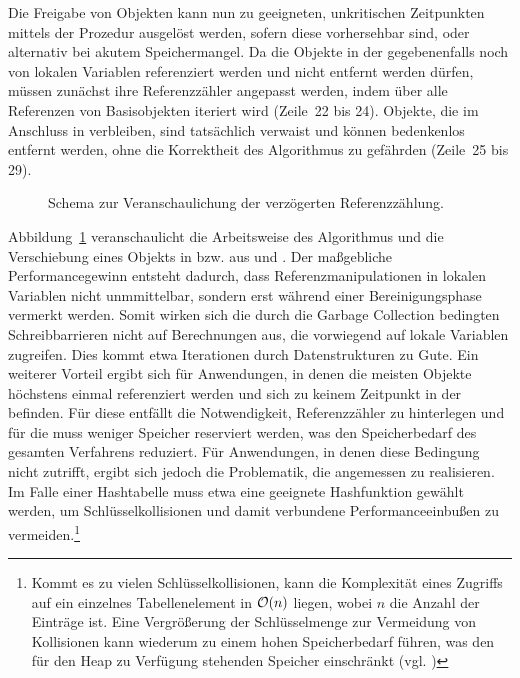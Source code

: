 Die Freigabe von Objekten kann nun zu geeigneten, unkritischen Zeitpunkten mittels der Prozedur  ausgelöst werden, sofern diese vorhersehbar sind, oder alternativ bei akutem Speichermangel.
Da die Objekte in der  gegebenenfalls noch von lokalen Variablen referenziert werden und nicht entfernt werden dürfen, müssen zunächst ihre Referenzzähler angepasst werden, indem über alle Referenzen von Basisobjekten iteriert wird (Zeile~22 bis 24).
Objekte, die im Anschluss in  verbleiben, sind tatsächlich verwaist und können bedenkenlos entfernt werden, ohne die Korrektheit des Algorithmus zu gefährden (Zeile~25 bis 29).

\begin{figure}[h]
	\centering
	
	\caption[Veranschaulichung der verzögerten Referenzzählung]{Schema zur Veranschaulichung der verzögerten Referenzzählung.}
	\label{fig:rc-deferred}
\end{figure}

Abbildung~\ref{fig:rc-deferred} veranschaulicht die Arbeitsweise des Algorithmus und die Verschiebung eines Objekts  in bzw. aus  und .
Der maßgebliche Performancegewinn entsteht dadurch, dass Referenzmanipulationen in lokalen Variablen nicht unmmittelbar, sondern erst während einer Bereinigungsphase vermerkt werden.
Somit wirken sich die durch die Garbage Collection bedingten Schreibbarrieren nicht auf Berechnungen aus, die vorwiegend auf lokale Variablen zugreifen.
Dies kommt etwa Iterationen durch Datenstrukturen zu Gute.
Ein weiterer Vorteil ergibt sich für Anwendungen, in denen die meisten Objekte höchstens einmal referenziert werden und sich zu keinem Zeitpunkt in der  befinden.
Für diese entfällt die Notwendigkeit, Referenzzähler zu hinterlegen und für die  muss weniger Speicher reserviert werden, was den Speicherbedarf des gesamten Verfahrens reduziert.
Für Anwendungen, in denen diese Bedingung nicht zutrifft, ergibt sich jedoch die Problematik, die  angemessen zu realisieren.
Im Falle einer Hashtabelle muss etwa eine geeignete Hashfunktion gewählt werden, um Schlüsselkollisionen und damit verbundene Performanceeinbußen zu vermeiden.\footnote{Kommt es zu vielen Schlüsselkollisionen, kann die Komplexität eines Zugriffs auf ein einzelnes Tabellenelement in $\mathcal{O}(n)$ liegen, wobei $n$ die Anzahl der Einträge ist. Eine Vergrößerung der Schlüsselmenge zur Vermeidung von Kollisionen kann wiederum zu einem hohen Speicherbedarf führen, was den für den Heap zu Verfügung stehenden Speicher einschränkt (vgl. \cite[S. 253]{cormen-leiserson})}

